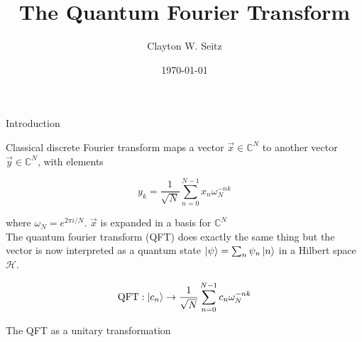 \documentclass[aspectratio=1610]{beamer}					%
\title{The Quantum Fourier Transform}	%
\author{Clayton W. Seitz}								%
\date{\today}									%
\begin{document}
\begin{frame}
  \titlepage
\end{frame}

\begin{frame}{Introduction}

Classical discrete Fourier transform maps a vector $\vec{x}\in \mathbb{C}^{N}$ to another vector $\vec{y}\in\mathbb{C}^{N}$, with elements

\begin{equation*}
y_{k} = \frac{1}{\sqrt{N}}\sum_{n=0}^{N-1}x_{n}\omega_{N}^{-nk}
\end{equation*}

where $\omega_{N} = e^{2\pi i/N}$. $\vec{x}$ is expanded in a basis for $\mathbb{C}^{N}$\\
\vspace{0.1in}
The quantum fourier transform (QFT) does exactly the same thing but the vector is now interpreted as a quantum state $\ket{\psi}=\sum_{n}\psi_{n}\ket{n}$ in a Hilbert space $\mathcal{H}$. 

\begin{equation*}
\mathrm{QFT}: \ket{c_{n}} \rightarrow \frac{1}{\sqrt{N}}\sum_{n=0}^{N-1}c_{n}\omega_{N}^{-nk}
\end{equation*}


\end{frame}

\begin{frame}{The QFT as a unitary transformation}

\end{frame}
\end{document}
